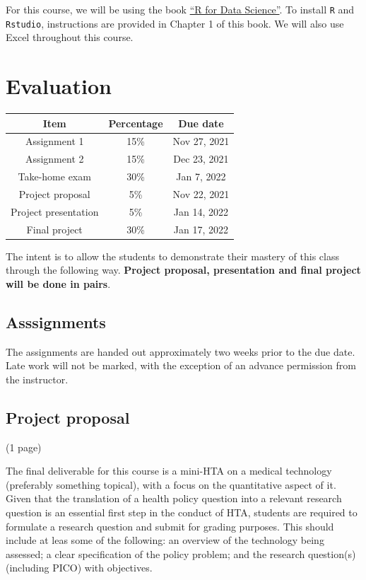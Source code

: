 \documentclass[
]{book}
\begin{document}
For this course, we will be using the book \href{https://r4ds.had.co.nz/}{``R for Data Science''}. To install \texttt{R} and \texttt{Rstudio}, instructions are provided in Chapter 1 of this book. We will also use Excel throughout this course.

\hypertarget{evaluation}{%
\section*{Evaluation}\label{evaluation}}

\begin{longtable}[]{@{}ccc@{}}
\toprule
Item & Percentage & Due date \\
\midrule
\endhead
Assignment 1 & 15\% & Nov 27, 2021 \\
Assignment 2 & 15\% & Dec 23, 2021 \\
Take-home exam & 30\% & Jan 7, 2022 \\
Project proposal & 5\% & Nov 22, 2021 \\
Project presentation & 5\% & Jan 14, 2022 \\
Final project & 30\% & Jan 17, 2022 \\
\bottomrule
\end{longtable}

The intent is to allow the students to demonstrate their mastery of this class through the following way. \textbf{Project proposal, presentation and final project will be done in pairs}.

\hypertarget{asssignments}{%
\subsection*{Asssignments}\label{asssignments}}

The assignments are handed out approximately two weeks prior to the due date. Late work will not be marked, with the exception of an advance permission from the instructor.

\hypertarget{project-proposal}{%
\subsection*{Project proposal}\label{project-proposal}}

(1 page)

The final deliverable for this course is a mini-HTA on a medical technology (preferably something topical), with a focus on the quantitative aspect of it. Given that the translation of a health policy question into a relevant research question is an essential first step in the conduct of HTA, students are required to formulate a research question and submit for grading purposes. This should include at leas some of the following: an overview of the technology being assessed; a clear specification of the policy problem; and the research question(s) (including PICO) with objectives.
\end{document}

